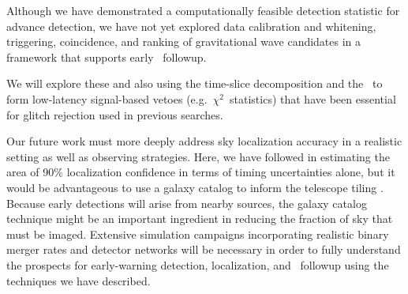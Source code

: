 Although we have demonstrated a computationally feasible detection statistic
for advance detection, we have not yet explored data calibration and whitening,
triggering, coincidence, and ranking of gravitational wave candidates in a
framework that supports early \EM\ followup.
\begin{comment}
One complication in deploying a
low-latency or early-warning search is that whitening the detector data
involves estimating the noise power spectrum, which is often done acausally.
We will have to look into causal or low latency alternatives to conventional
spectral estimation techniques.  
\end{comment}
We will explore these and also using the time-slice decomposition and the \SVD\
to form low-latency signal-based vetoes (e.g.~$\chi^2$~statistics) that have
been essential for glitch rejection used in previous \GW{} \CBC{} searches.

Our future work must more deeply address sky localization accuracy in a
realistic setting as well as observing strategies. Here, we have followed
\citet{Fairhurst2009} in estimating the area of 90\% localization confidence in
terms of timing uncertainties alone, but it would be advantageous to use a
galaxy catalog to inform the telescope tiling \citep{galaxy-catalog}. Because
early detections will arise from nearby sources, the galaxy catalog technique
might be an important ingredient in reducing the fraction of sky that must be
imaged.  Extensive simulation campaigns incorporating realistic binary merger
rates and detector networks will be necessary in order to fully understand the
prospects for early-warning detection, localization, and \EM\ followup using
the techniques we have described.
